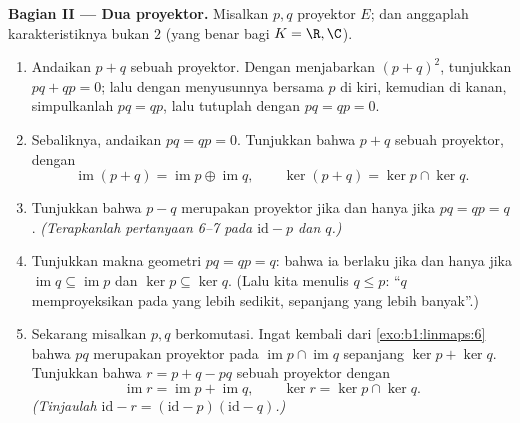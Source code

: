 \begin{problem}
\medskip
\noindent\textbf{Bagian II --- Dua proyektor.} Misalkan $p, q$
proyektor $E$; dan anggaplah karakteristiknya bukan $2$ (yang benar
bagi $K = \R, \C$).
\begin{enumerate}[resume]
  \item Andaikan $p + q$ sebuah proyektor. Dengan menjabarkan $(p + q)^2$,
        tunjukkan $pq + qp = 0$; lalu dengan menyusunnya bersama $p$ di kiri, kemudian
        di kanan, simpulkanlah $pq = qp$, lalu tutuplah dengan $pq = qp =
        0$.
  \item Sebaliknya, andaikan $pq = qp = 0$. Tunjukkan bahwa $p + q$ sebuah
        proyektor, dengan
        \[
        \operatorname{im}(p + q) = \operatorname{im} p \oplus
        \operatorname{im} q,
        \qquad
        \ker(p + q) = \ker p \cap \ker q .
        \]
  \item Tunjukkan bahwa $p - q$ merupakan proyektor jika dan hanya jika $pq = qp
        = q$. \emph{(Terapkanlah pertanyaan 6--7 pada $\mathrm{id} - p$
        dan $q$.)}
  \item Tunjukkan makna geometri $pq = qp = q$: bahwa ia berlaku jika
        dan hanya jika $\operatorname{im} q \subseteq
        \operatorname{im} p$ dan $\ker p \subseteq \ker q$. (Lalu
        kita menulis $q \leq p$: ``$q$ memproyeksikan pada yang lebih sedikit, sepanjang
        yang lebih banyak''.)
  \item Sekarang misalkan $p, q$ berkomutasi. Ingat kembali dari
        \cref{exo:b1:linmaps:6} bahwa $pq$ merupakan proyektor pada
        $\operatorname{im} p \cap \operatorname{im} q$ sepanjang
        $\ker p + \ker q$. Tunjukkan bahwa $r = p + q - pq$ sebuah
        proyektor dengan
        \[
        \operatorname{im} r = \operatorname{im} p +
        \operatorname{im} q,
        \qquad
        \ker r = \ker p \cap \ker q .
        \]
        \emph{(Tinjaulah $\mathrm{id} - r = (\mathrm{id} -
        p)(\mathrm{id} - q)$.)}
\end{enumerate}


\end{problem}
